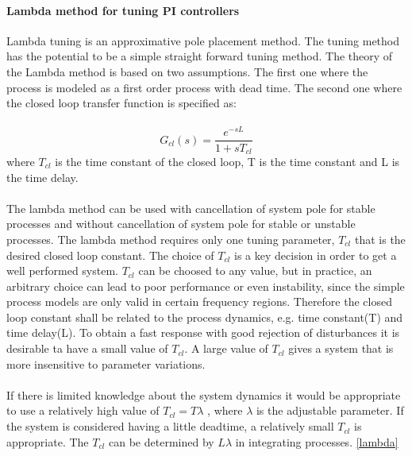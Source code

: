 \paragraph{Lambda method for tuning PI controllers}
Lambda tuning is an approximative pole placement method. The tuning method has the potential to be a simple straight forward tuning method. The theory of the Lambda method is based on two assumptions. The first one where the process is modeled as a first order process with dead time. The second one where the closed loop transfer function is specified as:\\
\\
\begin{equation}
\label{eq:lambda}
G_{cl}(s) = \frac{e^{-sL}}{1+ sT_{cl}}
\end{equation}
where $ T_{cl} $ is the time constant of the closed loop, T is the time constant and L is the time delay.\\
\\
The lambda method can be used with cancellation of system pole for stable processes and without cancellation of system pole for stable or unstable processes. The lambda method requires only one tuning parameter, $ T_{cl} $ that is the desired closed loop constant. The choice of $ T_{cl} $ is a key decision in order to get a well performed system. $ T_{cl} $ can be choosed to any value, but in practice, an arbitrary choice can lead to poor performance or even instability, since the simple process models are only valid in certain frequency regions. Therefore the closed loop constant shall be related to the process dynamics, e.g. time constant(T) and time delay(L). To obtain a fast response with good rejection of disturbances it is desirable ta have a small value of $ T_{cl} $. A large value of $ T_{cl} $  gives a system that is more insensitive to parameter variations. \\
\\
If there is limited knowledge about the system dynamics it would be appropriate to use a relatively high value of $ T_{cl}  =T\lambda $ , where $\lambda$ is the adjustable parameter. If the system is considered having a little deadtime, a relatively small $ T_{cl} $ is appropriate. The $ T_{cl} $ can be determined by $ L\lambda $ in integrating processes. 
\ref{lambda}










